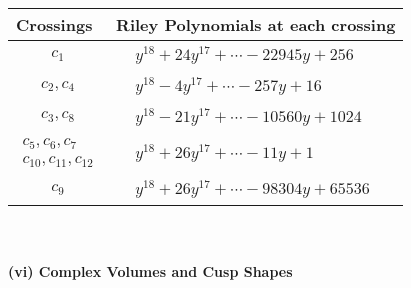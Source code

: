\documentclass[1p]{elsarticle_modified}
\theoremstyle{definition}
\begin{document}
\begin{tabular}{m{50pt}|m{274pt}}
Crossings & \hspace{64pt}Riley Polynomials at each crossing \\
\hline $$\begin{aligned}c_{1}\end{aligned}$$&$\begin{aligned}
&y^{18}+24 y^{17}+\cdots-22945 y+256
\end{aligned}$\\
\hline $$\begin{aligned}c_{2},c_{4}\end{aligned}$$&$\begin{aligned}
&y^{18}-4 y^{17}+\cdots-257 y+16
\end{aligned}$\\
\hline $$\begin{aligned}c_{3},c_{8}\end{aligned}$$&$\begin{aligned}
&y^{18}-21 y^{17}+\cdots-10560 y+1024
\end{aligned}$\\
\hline $$\begin{aligned}c_{5},c_{6},c_{7}\\c_{10},c_{11},c_{12}\end{aligned}$$&$\begin{aligned}
&y^{18}+26 y^{17}+\cdots-11 y+1
\end{aligned}$\\
\hline $$\begin{aligned}c_{9}\end{aligned}$$&$\begin{aligned}
&y^{18}+26 y^{17}+\cdots-98304 y+65536
\end{aligned}$\\
\hline
\end{tabular}\\~\\
\newpage\flushleft \textbf{(vi) Complex Volumes and Cusp Shapes}
\end{document}
